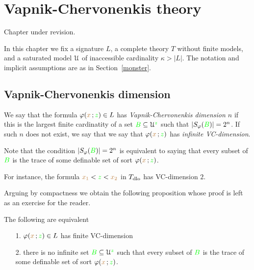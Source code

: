 \chapter{Vapnik-Chervonenkis theory}
\label{vc}


\noindent\llap{\textcolor{red}{\Large\warning}\kern1.5ex}\ignorespaces
Chapter under revision.

\def\medrel#1{\parbox[t]{6ex}{$\displaystyle\hfil #1$}}
\def\ceq#1#2#3{\parbox{25ex}{$\displaystyle #1$}\medrel{#2}$\displaystyle  #3$}

In this chapter we fix a signature $L$, a complete theory $T$ without finite models, and a saturated model $\EuScript U$ of inaccessible cardinality $\kappa>|L|$.
The notation and implicit assumptions are as in Section~\ref{monster}.

\section{Vapnik-Chervonenkis dimension}
\label{VCdim}

\def\ceq#1#2#3{\parbox{25ex}{$\displaystyle #1$}\medrel{#2}$\displaystyle  #3$}

We say that the formula $\varphi({\color{brown} x}\,;{\color{green} z})\in L$ has \emph{Vapnik-Chervonenkis dimension $n$\/} if this is the largest finite cardinatity of a set ${\color{green} B}\subseteq\EuScript U^{\color{green} z}$ such that $|S_\varphi({\color{green} B})|=2^n$. If such $n$ does not exist, we say that we say that  $\varphi({\color{brown} x}\,;{\color{green} z})$ has \emph{infinite VC-dimension}. 

Note that the condition $|S_\varphi({\color{green} B})|=2^n$ is equivalent to saying that every subset of ${\color{green} B}$ is the trace of some definable set of sort $\varphi({\color{brown} x}\,;{\color{green} z})$.

For instance, the formula ${\color{brown} x_1}<{\color{green} z}<{\color{brown} x_2}$ in $T_{\rm dlo}$ has VC-dimension $2$.

Arguing by compactness we obtain the following proposition whose proof is left as an exercise for the reader.

\begin{proposition}
The following are equivalent 
\begin{itemize}
\item[1.] $\varphi({\color{brown} x}\,;{\color{green} z})\in L$ has finite VC-dimension
\item[2.] there is no infinite set ${\color{green} B}\subseteq\EuScript U^{\color{green} z}$ such that every subset of ${\color{green} B}$ is the trace of some definable set of sort $\varphi({\color{brown} x}\,;{\color{green} z})$.
\end{itemize}
\end{proposition}

